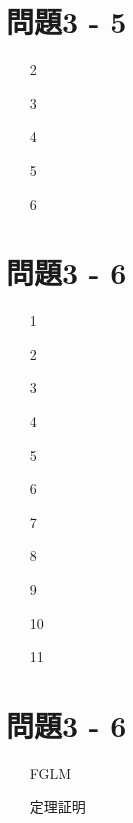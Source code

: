 \documentclass[12pt,a4paper]{jsarticle}
\begin{document}
\section*{問題3 - 5}
\begin{enumerate}
 \item[2]  \mbox{} \\
 \item[3]  \mbox{} \\
 \item[4]  \mbox{} \\
 \item[5]  \mbox{} \\
 \item[6]  \mbox{} \\
\end{enumerate}
\pagebreak

\section*{問題3 - 6}
\begin{enumerate}
 \item[1]  \mbox{} \\
 \item[2]  \mbox{} \\
 \item[3]  \mbox{} \\
 \item[4]  \mbox{} \\
 \item[5]  \mbox{} \\
 \item[6]  \mbox{} \\
 \item[7]  \mbox{} \\
 \item[8]  \mbox{} \\
 \item[9]  \mbox{} \\
 \item[10]  \mbox{} \\
 \item[11]  \mbox{} \\
\end{enumerate}
\pagebreak

\section*{問題3 - 6}
\begin{enumerate}
 \item[FGLM]  \mbox{} \\
 \item[定理証明]  \mbox{} \\
\end{enumerate}
\end{document}
